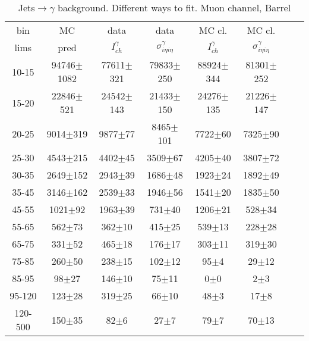 \begin{table}[h]
  \tiny
  \begin{center}
  \caption{Jets$\rightarrow\gamma$ background. Different ways to fit. Muon channel, Barrel}
  \begin{tabular}{|c|c|c|c|c|c|c|c|}
    bin &  MC   & data  & data  & MC cl. & MC cl.\\ 
    lims & pred & $I_{ch}^{\gamma}$ & $\sigma_{i\eta i\eta}^\gamma$  & $I_{ch}^{\gamma}$  & $\sigma_{i\eta i\eta}^\gamma$  \\ \hline
10-15 & 94746$\pm$1082 & 77611$\pm$321 & 79833$\pm$250 & 88924$\pm$344 & 81301$\pm$252   \\ \hline
15-20 & 22846$\pm$521 & 24542$\pm$143 & 21433$\pm$150 & 24276$\pm$135 & 21226$\pm$147   \\ \hline
20-25 & 9014$\pm$319 & 9877$\pm$77 & 8465$\pm$101 & 7722$\pm$60 & 7325$\pm$90   \\ \hline
25-30 & 4543$\pm$215 & 4402$\pm$45 & 3509$\pm$67 & 4205$\pm$40 & 3807$\pm$72   \\ \hline
30-35 & 2649$\pm$152 & 2943$\pm$39 & 1686$\pm$48 & 1923$\pm$24 & 1892$\pm$49   \\ \hline
35-45 & 3146$\pm$162 & 2539$\pm$33 & 1946$\pm$56 & 1541$\pm$20 & 1835$\pm$50   \\ \hline
45-55 & 1021$\pm$92 & 1963$\pm$39 & 731$\pm$40 & 1206$\pm$21 & 528$\pm$34   \\ \hline
55-65 & 562$\pm$73 & 362$\pm$10 & 415$\pm$25 & 539$\pm$13 & 228$\pm$28   \\ \hline
65-75 & 331$\pm$52 & 465$\pm$18 & 176$\pm$17 & 303$\pm$11 & 319$\pm$30   \\ \hline
75-85 & 260$\pm$50 & 238$\pm$15 & 102$\pm$12 & 95$\pm$4 & 29$\pm$12   \\ \hline
85-95 & 98$\pm$27 & 146$\pm$10 & 75$\pm$11 & 0$\pm$0 & 2$\pm$3   \\ \hline
95-120 & 123$\pm$28 & 319$\pm$25 & 66$\pm$10 & 48$\pm$3 & 17$\pm$8   \\ \hline
120-500 & 150$\pm$35 & 82$\pm$6 & 27$\pm$7 & 79$\pm$7 & 70$\pm$13   \\ \hline
  \end{tabular}
  \label{tab:Jets_to_gamma_diff_ways_to_fit_0}
  \end{center}
\end{table}

